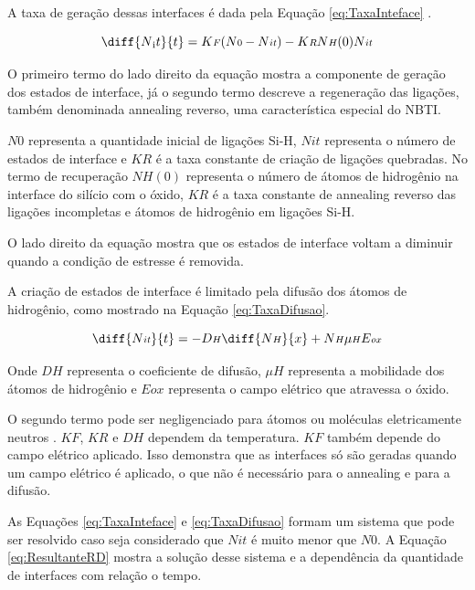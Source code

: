 A taxa de geração dessas interfaces é dada pela Equação \ref{eq:TaxaInteface} \cite{Lorenz}.

\begin{equation}
    \label{eq:TaxaInteface}
    \diff{N{\textsubscript it}}{t} = K{\scriptstyle F}(N{\scriptstyle 0} - N{\scriptstyle it}) - K{\scriptstyle R}N{\scriptstyle H}(0)N{\scriptstyle it}
\end{equation}

O primeiro termo do lado direito da equação mostra a componente de geração dos estados de interface, já o segundo termo descreve a regeneração das ligações, também denominada annealing reverso, uma característica especial do NBTI.

$N\scriptstyle{0}$ representa a quantidade inicial de ligações Si-H, $N\scriptstyle{it}$ representa o número de estados de interface e $K\scriptstyle{R}$ é a taxa constante de criação de ligações quebradas. No termo de recuperação $N\scriptstyle{H}(0)$ representa o número de átomos de hidrogênio na interface do silício com o óxido, $K\scriptstyle{R}$ é a taxa constante de annealing reverso das ligações incompletas e átomos de hidrogênio em ligações Si-H.

O lado direito da equação mostra que os estados de interface voltam a diminuir quando a condição de estresse é removida.

A criação de estados de interface é limitado pela difusão dos átomos de hidrogênio, como mostrado na Equação \ref{eq:TaxaDifusao}.

\begin{equation}
    \label{eq:TaxaDifusao}
    \diff{N{\scriptstyle it}}{t} = - D{\scriptstyle H}\diff{N{\scriptstyle H}}{x} + N{\scriptstyle H}\mu{\scriptstyle H}E{\scriptstyle ox}
\end{equation}

Onde $D\scriptstyle{H}$ representa o coeficiente de difusão, $\mu\scriptstyle{H}$ representa a mobilidade dos átomos de hidrogênio e $E\scriptstyle{ox}$ representa o campo elétrico que atravessa o óxido.

O segundo termo pode ser negligenciado para átomos ou moléculas eletricamente neutros \cite{Lorenz}. $K\scriptstyle{F}$, $K\scriptstyle{R}$ e $D\scriptstyle{H}$ dependem da temperatura. $K\scriptstyle{F}$ também depende do campo elétrico aplicado. Isso demonstra que as interfaces só são geradas quando um campo elétrico é aplicado, o que não é necessário para o annealing e para a difusão.

As Equações \ref{eq:TaxaInteface} e \ref{eq:TaxaDifusao} formam um sistema que pode ser resolvido caso seja considerado que $N\scriptstyle{it}$ é muito menor que $N\scriptstyle{0}$. A Equação \ref{eq:ResultanteRD} mostra a solução desse sistema e a dependência da quantidade de interfaces com relação o tempo.

